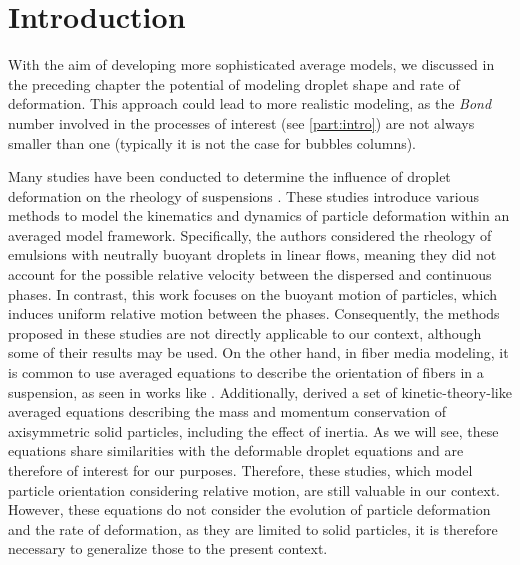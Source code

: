 \section{Introduction}
\label{sec:intro_ellipse}
With the aim of developing more sophisticated average models, we discussed in the preceding chapter the potential of modeling droplet shape and rate of deformation. 
This approach could lead to more realistic modeling, as the \textit{Bond} number involved in the processes of interest (see \ref{part:intro}) are not always smaller than one (typically it is not the case for bubbles columns). 

Many studies have been conducted to determine the influence of droplet deformation on the rheology of suspensions 
\citep{goddard1967nonlinear,lhuillier1987phenomenology,rallison1984deformation,Cox1969deformation,stone1994dynamics,wu2002ellipsoidal,mwasame2017macroscopic}.
These studies introduce various methods to model the kinematics   and dynamics of particle deformation within an averaged model framework. 
Specifically, the authors considered the rheology of emulsions with neutrally buoyant droplets in linear flows, meaning they did not account for the possible relative velocity between the dispersed and continuous phases. 
In contrast, this work focuses on the buoyant motion of particles, which induces uniform relative motion between the phases. 
Consequently, the methods proposed in these studies are not directly applicable to our context, although some of their results may be used. 
On the other hand, in fiber media modeling, it is common to use averaged equations to describe the orientation of fibers in a suspension, as seen in works like \citet{wang2008objective}. 
Additionally, \citet{curtiss1956kinetic} derived a set of kinetic-theory-like averaged equations describing the mass and momentum conservation of axisymmetric solid particles, including the effect of inertia. 
As we will see, these equations share similarities with the deformable droplet equations and are therefore of interest for our purposes.
Therefore, these studies, which model particle orientation considering relative motion, are still valuable in our context. 
However, these equations do not consider the evolution of particle deformation and the rate of deformation, as they are limited to solid particles, it is therefore necessary to generalize those to the present context.  

